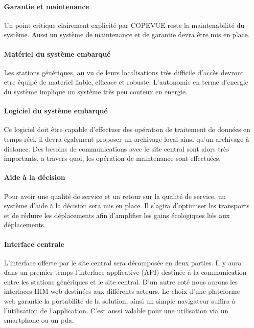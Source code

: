 \paragraph{Garantie et maintenance\\}
Un point critique clairement explicité par COPEVUE reste la maintenabilité du système. Aussi un système de maintenance et de garantie
devra être mis en place.

\paragraph{Matériel du système embarqué\\}
Les stations génériques, au vu de leurs localisations très difficile d'accès devront etre équipé de materiel fiable, efficace et robuste.
L'autonomie en terme d'energie du système implique un système très peu couteux en energie.

\paragraph{Logiciel du système embarqué\\}
Ce logiciel doit être capable d'effectuer des opération de traitement de données en temps réel. il devra également proposer un archivage local
ainsi qu'un archivage à distance. Des besoins de communications avec le site central sont alors très importants. a travers quoi, les opération de maintenance
sont effectuées.

\paragraph{Aide à la décision\\}
Pour avoir une qualité de service et un retour sur la qualité de service, un système d'aide à la décision sera mis en place.
Il s'agira d'optimiser les transports et de réduire les déplacements afin d'amplifier les gains écologiques liés aux déplacements.


\paragraph{Interface centrale\\}
L’interface offerte par le site central sera décomposée en deux parties.
Il y aura dans un premier temps l’interface applicative (API) destinée à la communication entre les
stations génériques et le site central.
D’un autre coté nous aurons les interfaces IHM web destinées aux différents acteurs.
Le choix d'une plateforme web garantie la portabilité de la solution, ainsi un simple navigateur suffira à l'utilisation de l'application. C'est 
aussi valable pour une utilisation via un smartphone ou un pda.

